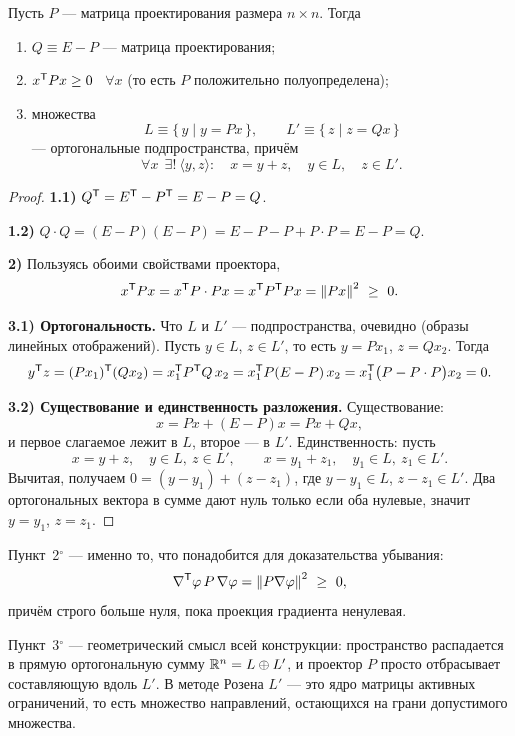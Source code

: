 \begin{lemma}\label{lem:projector}
Пусть $P$ — матрица проектирования размера $n \times n$. Тогда
\begin{enumerate}[label=$\arabic*^\circ$,left=0pt]
  \item $Q \equiv E - P$ — матрица проектирования;
  \item $x^{\mathsf{T}} P x \ge 0$ \ $\forall x$ (то есть $P$ положительно полуопределена);
  \item множества
        \[
          L \equiv \{\, y \mid y = Px \,\} ,
          \qquad
          L' \equiv \{\, z \mid z = Qx \,\}
        \]
        — ортогональные подпространства, причём
        \[
          \forall x \ \ \exists!\ \langle y, z\rangle :
          \quad x = y + z , \quad y \in L , \quad z \in L' .
        \]
\end{enumerate}
\end{lemma}

\begin{proof}
\textbf{1.1)} $Q^{\mathsf{T}} = E^{\mathsf{T}} - P^{\mathsf{T}} = E - P = Q$.

\medskip
\textbf{1.2)}
$Q \cdot Q = (E-P)(E-P) = E - P - P + P\cdot P = E - P = Q$.

\medskip
\textbf{2)} Пользуясь обоими свойствами проектора,
\[
  x^{\mathsf{T}} P x = x^{\mathsf{T}} P \cdot P x = x^{\mathsf{T}} P^{\mathsf{T}} P x = \left\lVert P x \right\rVert^2 \ \ge\ 0 .
\]

\medskip
\textbf{3.1) Ортогональность.} Что $L$ и $L'$ — подпространства, очевидно
(образы линейных отображений). Пусть $y \in L$, $z \in L'$, то есть
$y = Px_1$, $z = Qx_2$. Тогда
\[
  y^{\mathsf{T}} z = (P x_1)^{\mathsf{T}} (Q x_2) = x_1^{\mathsf{T}} P^{\mathsf{T}} Q\, x_2
        = x_1^{\mathsf{T}} P (E - P)\, x_2
        = x_1^{\mathsf{T}} \big(P - P\cdot P\big) x_2 = 0 .
\]

\medskip
\textbf{3.2) Существование и единственность разложения.} Существование:
\[
  x = Px + (E - P)x = Px + Qx ,
\]
и первое слагаемое лежит в $L$, второе — в $L'$. Единственность: пусть
\[
  x = y + z , \quad y \in L,\ z \in L' ,
  \qquad
  x = y_1 + z_1 , \quad y_1 \in L,\ z_1 \in L' .
\]
Вычитая, получаем $0 = (y - y_1) + (z - z_1)$, где $y - y_1 \in L$,
$z - z_1 \in L'$. Два ортогональных вектора в сумме дают нуль только если оба
нулевые, значит $y = y_1$, $z = z_1$.
\end{proof}


\begin{idea}
Пункт~2$^\circ$ — именно то, что понадобится для доказательства убывания:
\[
  \nabla^{\mathsf{T}}\varphi\, P\, \nabla\varphi = \left\lVert P\nabla\varphi \right\rVert^2 \ \ge\ 0 ,
\]
причём строго больше нуля, пока проекция градиента ненулевая.

Пункт~3$^\circ$ — геометрический смысл всей конструкции: пространство
распадается в прямую ортогональную сумму $\mathbb{R}^n = L \oplus L'$, и проектор $P$
просто отбрасывает составляющую вдоль $L'$. В методе Розена $L'$ — это ядро
матрицы активных ограничений, то есть множество направлений, остающихся на
грани допустимого множества.
\end{idea}
